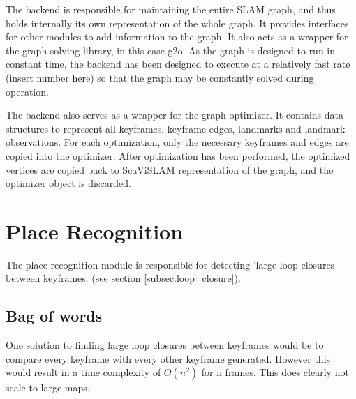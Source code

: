 The backend is responsible for maintaining the entire SLAM graph, and thus holds internally its
own representation of the whole graph.  It provides interfaces for other modules to add information
to the graph. It also acts as a wrapper for the graph solving library, in this case g2o. As the
graph is designed to run in constant time, the backend has been designed to execute at a relatively
fast rate (insert number here) so that the graph may be constantly solved during operation.


The backend also serves as a wrapper for the graph optimizer.  It contains data structures to
represent all keyframes, keyframe edges, landmarks and landmark observations.  For each
optimization, only the necessary keyframes and edges are copied into the optimizer.  After
optimization has been performed, the optimized vertices are copied back to ScaViSLAM representation
of the graph, and the optimizer object is discarded.

\section{Place Recognition}
\label{sec:scavislam_place_recog}

The place recognition module is responsible for detecting 'large loop closures' between keyframes.
(see section \ref{subsec:loop_closure}).

\subsection{Bag of words}

One solution to finding large loop closures between keyframes would be to compare every keyframe
with every other keyframe generated.  However this would result in a time complexity of $O(n^2)$ for
n frames.  This does clearly not scale to large maps.

